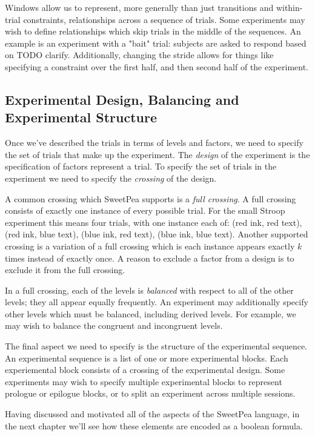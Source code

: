 Windows allow us to represent, more generally than just transitions and within-trial constraints, relationships across a sequence of trials. Some experiments may wish to define relationships which skip trials in the middle of the sequences. An example is an experiment with a "bait" trial: subjects are asked to respond based on  TODO clarify. Additionally, changing the stride allows for things like specifying a constraint over the first half, and then second half of the experiment.

\subsection{Experimental Design, Balancing and Experimental Structure}

Once we've described the trials in terms of levels and factors, we need to specify the set of trials that make up the experiment. The \emph{design} of the experiment is the specification of factors represent a trial. To specify the set of trials in the experiment we need to specify the \emph{crossing} of the design.

A common crossing which SweetPea supports is a \emph{full crossing}. A full crossing consists of exactly one instance of every possible trial. For the small Stroop experiment this means four trials, with one instance each of: (red ink, red text), (red ink, blue text), (blue ink, red text), (blue ink, blue text). Another supported crossing is a variation of a full crossing which is each instance appears exactly $k$ times instead of exactly once. A reason to exclude a factor from a design is to exclude it from the full crossing.

In a full crossing, each of the levels is \emph{balanced} with respect to all of the other levels; they all appear equally frequently. An experiment may additionally specify other levels which must be balanced, including derived levels. For example, we may wish to balance the congruent and incongruent levels.

The final aspect we need to specify is the structure of the experimental sequence. An experimental sequence is a list of one or more experimental blocks. Each experiemental block consists of a crossing of the experimental design. Some experiments may wish to specify multiple experimental blocks to represent prologue or epilogue blocks, or to split an experiment across multiple sessions.

Having discussed and motivated all of the aspects of the SweetPea language, in the next chapter we'll see how these elements are encoded as a boolean formula.
